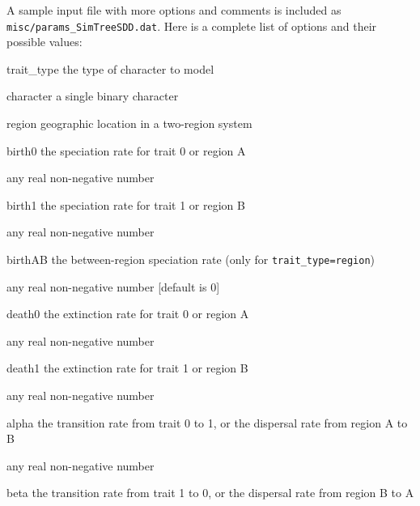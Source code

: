 \documentclass[10pt]{article}
\begin{document}
A sample input file with more options and comments is included as \texttt{misc/params\_SimTreeSDD.dat}.  
Here is a complete list of options and their possible values:
\begin{optdescrip}
	\item[trait\_type] the type of character to model
		\begin{valdescrip}
			\item[character] a single binary character
			\item[region] geographic location in a two-region system
		\end{valdescrip}
	\item[birth0] the speciation rate for trait 0 or region A
		\begin{valdescrip}
			\item[] any real non-negative number
		\end{valdescrip}
	\item[birth1] the speciation rate for trait 1 or region B
		\begin{valdescrip}
			\item[] any real non-negative number
		\end{valdescrip}
	\item[birthAB] the between-region speciation rate (only for \texttt{trait\_type=region})
		\begin{valdescrip}
			\item[] any real non-negative number [default is 0]
		\end{valdescrip}
	\item[death0] the extinction rate for trait 0 or region A
		\begin{valdescrip}
			\item[] any real non-negative number
		\end{valdescrip}
	\item[death1] the extinction rate for trait 1 or region B
		\begin{valdescrip}
			\item[] any real non-negative number
		\end{valdescrip}
	\item[alpha] the transition rate from trait 0 to 1, or the dispersal rate from region A to B
		\begin{valdescrip}
			\item[] any real non-negative number
		\end{valdescrip}
	\item[beta] the transition rate from trait 1 to 0, or the dispersal rate from region B to A

\end{optdescrip}
\end{document}
